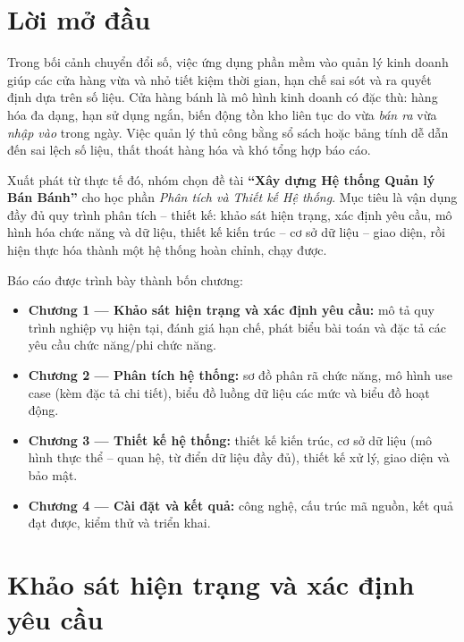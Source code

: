 \documentclass[12pt,a4paper]{report}
\begin{document}
\chapter*{Lời mở đầu}

Trong bối cảnh chuyển đổi số, việc ứng dụng phần mềm vào quản lý kinh doanh giúp các cửa hàng vừa và nhỏ tiết kiệm thời gian, hạn chế sai sót và ra quyết định dựa trên số liệu. Cửa hàng bánh là mô hình kinh doanh có đặc thù: hàng hóa đa dạng, hạn sử dụng ngắn, biến động tồn kho liên tục do vừa \emph{bán ra} vừa \emph{nhập vào} trong ngày. Việc quản lý thủ công bằng sổ sách hoặc bảng tính dễ dẫn đến sai lệch số liệu, thất thoát hàng hóa và khó tổng hợp báo cáo.

Xuất phát từ thực tế đó, nhóm chọn đề tài \textbf{``Xây dựng Hệ thống Quản lý Bán Bánh''} cho học phần \textit{Phân tích và Thiết kế Hệ thống}. Mục tiêu là vận dụng đầy đủ quy trình phân tích -- thiết kế: khảo sát hiện trạng, xác định yêu cầu, mô hình hóa chức năng và dữ liệu, thiết kế kiến trúc -- cơ sở dữ liệu -- giao diện, rồi hiện thực hóa thành một hệ thống hoàn chỉnh, chạy được.

Báo cáo được trình bày thành bốn chương:
\begin{itemize}[leftmargin=1.4cm,nosep]
  \item \textbf{Chương 1 --- Khảo sát hiện trạng và xác định yêu cầu:} mô tả quy trình nghiệp vụ hiện tại, đánh giá hạn chế, phát biểu bài toán và đặc tả các yêu cầu chức năng/phi chức năng.
  \item \textbf{Chương 2 --- Phân tích hệ thống:} sơ đồ phân rã chức năng, mô hình use case (kèm đặc tả chi tiết), biểu đồ luồng dữ liệu các mức và biểu đồ hoạt động.
  \item \textbf{Chương 3 --- Thiết kế hệ thống:} thiết kế kiến trúc, cơ sở dữ liệu (mô hình thực thể -- quan hệ, từ điển dữ liệu đầy đủ), thiết kế xử lý, giao diện và bảo mật.
  \item \textbf{Chương 4 --- Cài đặt và kết quả:} công nghệ, cấu trúc mã nguồn, kết quả đạt được, kiểm thử và triển khai.
\end{itemize}

\chapter{Khảo sát hiện trạng và xác định yêu cầu}
\end{document}
